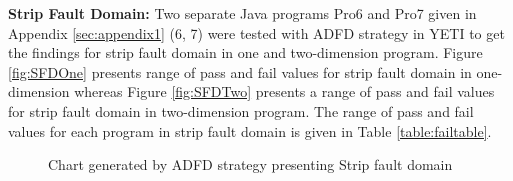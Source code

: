 \newpage
\noindent \textbf{Strip Fault Domain:} Two separate Java programs Pro6 and Pro7 given in Appendix \ref{sec:appendix1} (6, 7) were tested with ADFD strategy in YETI to get the findings for strip fault domain in one and two-dimension program. Figure \ref{fig:SFDOne} presents range of pass and fail values for strip fault domain in one-dimension whereas Figure \ref{fig:SFDTwo} presents a range of pass and fail values for strip fault domain in two-dimension program. The range of pass and fail values for each program in strip fault domain is given in Table \ref{table:failtable}.


%
\begin{figure} [H]
\centering
{}
\bigskip
{}
\bigskip
\caption{Chart generated by ADFD strategy presenting Strip fault domain}
\end{figure}






